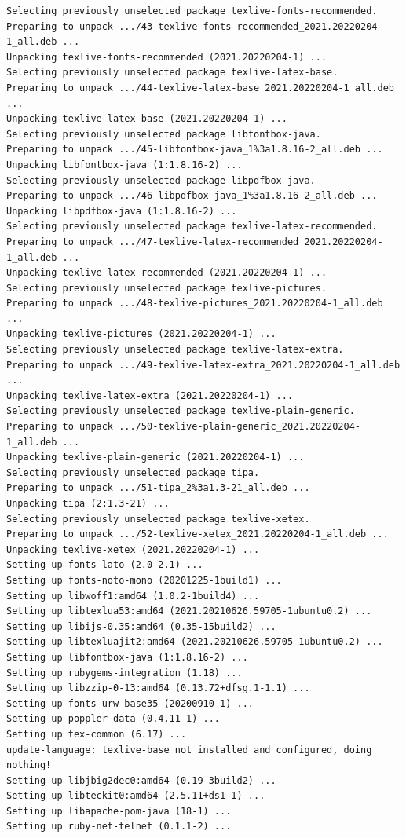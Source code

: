 \documentclass[
  11pt,
  letterpaper,
]{book}
\begin{document}
\begin{verbatim}
Selecting previously unselected package texlive-fonts-recommended.
Preparing to unpack .../43-texlive-fonts-recommended_2021.20220204-1_all.deb ...
Unpacking texlive-fonts-recommended (2021.20220204-1) ...
Selecting previously unselected package texlive-latex-base.
Preparing to unpack .../44-texlive-latex-base_2021.20220204-1_all.deb ...
Unpacking texlive-latex-base (2021.20220204-1) ...
Selecting previously unselected package libfontbox-java.
Preparing to unpack .../45-libfontbox-java_1%3a1.8.16-2_all.deb ...
Unpacking libfontbox-java (1:1.8.16-2) ...
Selecting previously unselected package libpdfbox-java.
Preparing to unpack .../46-libpdfbox-java_1%3a1.8.16-2_all.deb ...
Unpacking libpdfbox-java (1:1.8.16-2) ...
Selecting previously unselected package texlive-latex-recommended.
Preparing to unpack .../47-texlive-latex-recommended_2021.20220204-1_all.deb ...
Unpacking texlive-latex-recommended (2021.20220204-1) ...
Selecting previously unselected package texlive-pictures.
Preparing to unpack .../48-texlive-pictures_2021.20220204-1_all.deb ...
Unpacking texlive-pictures (2021.20220204-1) ...
Selecting previously unselected package texlive-latex-extra.
Preparing to unpack .../49-texlive-latex-extra_2021.20220204-1_all.deb ...
Unpacking texlive-latex-extra (2021.20220204-1) ...
Selecting previously unselected package texlive-plain-generic.
Preparing to unpack .../50-texlive-plain-generic_2021.20220204-1_all.deb ...
Unpacking texlive-plain-generic (2021.20220204-1) ...
Selecting previously unselected package tipa.
Preparing to unpack .../51-tipa_2%3a1.3-21_all.deb ...
Unpacking tipa (2:1.3-21) ...
Selecting previously unselected package texlive-xetex.
Preparing to unpack .../52-texlive-xetex_2021.20220204-1_all.deb ...
Unpacking texlive-xetex (2021.20220204-1) ...
Setting up fonts-lato (2.0-2.1) ...
Setting up fonts-noto-mono (20201225-1build1) ...
Setting up libwoff1:amd64 (1.0.2-1build4) ...
Setting up libtexlua53:amd64 (2021.20210626.59705-1ubuntu0.2) ...
Setting up libijs-0.35:amd64 (0.35-15build2) ...
Setting up libtexluajit2:amd64 (2021.20210626.59705-1ubuntu0.2) ...
Setting up libfontbox-java (1:1.8.16-2) ...
Setting up rubygems-integration (1.18) ...
Setting up libzzip-0-13:amd64 (0.13.72+dfsg.1-1.1) ...
Setting up fonts-urw-base35 (20200910-1) ...
Setting up poppler-data (0.4.11-1) ...
Setting up tex-common (6.17) ...
update-language: texlive-base not installed and configured, doing nothing!
Setting up libjbig2dec0:amd64 (0.19-3build2) ...
Setting up libteckit0:amd64 (2.5.11+ds1-1) ...
Setting up libapache-pom-java (18-1) ...
Setting up ruby-net-telnet (0.1.1-2) ...

\end{verbatim}
\end{document}
